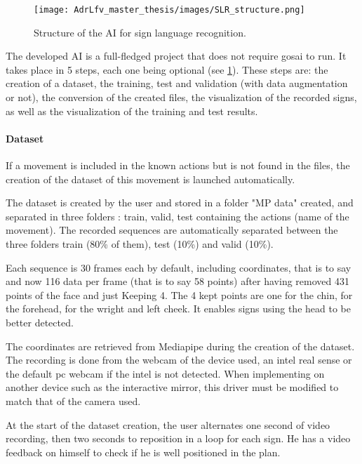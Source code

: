 \begin{figure}[h]
    \centering
    \texttt{[image: AdrLfv\_master\_thesis/images/SLR\_structure.png]}
    \caption{Structure of the AI for sign language recognition.}
    \label{fig:SLR_structure}
\end{figure}

The developed AI is a full-fledged project that does not require gosai to run. It takes place in 5 steps, each one being optional (see \ref{fig:SLR_structure}). These steps are: the creation of a dataset, the training, test and validation (with data augmentation or not), the conversion of the created files, the visualization of the recorded signs, as well as the visualization of the training and test results.

\paragraph{Dataset}

If a movement is included in the known actions but is not found in the files, the creation of the dataset of this movement is launched automatically. 

The dataset is created by the user and stored in a folder "MP data" created, and separated in three
folders : train, valid, test containing the actions (name of the movement). The recorded sequences are automatically separated between the three folders train (80\% of them), test (10\%) and valid (10\%). 

Each sequence is 30 frames each by default, including coordinates, that is to say and now 116 data per frame (that is to say 58 points) after having removed  431 points of the face and just Keeping 4. The 4 kept points are one for the chin, for the forehead, for the wright and left cheek.
It enables signs using the head to be better detected.

The coordinates are retrieved from Mediapipe during the creation of the dataset. The recording is done from the webcam of the device used, an intel real sense or the default pc webcam if the intel is not detected. When implementing on another device such as the interactive mirror, this driver must be modified to match that of the camera used.

At the start of the dataset creation, the user alternates one second of video recording, then two seconds to reposition in a loop for each sign. He has a video feedback on himself to check if he is well positioned in the plan.


